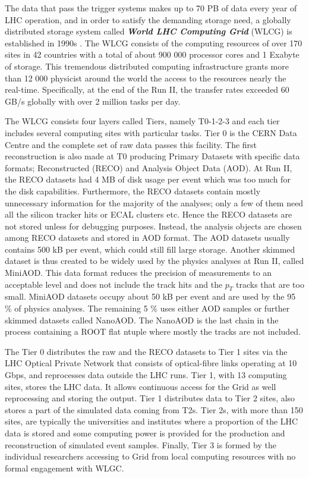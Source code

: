 The data that pass the trigger systems makes up to 70 PB of data every year of LHC operation, and in order to satisfy the demanding storage need, a globally distributed storage system called \emph{\textbf{World LHC Computing Grid}} (WLCG) is established in 1990s \cite{Bayatyan:838359}. The WLCG consists of the computing resources of over 170 sites in 42 countries with a total of about 900 000 processor cores and 1 Exabyte of storage. This tremendous distributed computing infrastructure grants more than 12 000 physicist around the world the access to the resources nearly the real-time. Specifically, at the end of the Run II, the transfer rates exceeded 60 GB/s globally with over 2 million tasks per day.

The WLCG consists four layers called Tiers, namely T0-1-2-3 and each tier includes several computing sites with particular tasks. Tier 0 is the CERN Data Centre and the complete set of raw data passes this facility. The first reconstruction is also made at T0 producing Primary Datasets with specific data formats; Reconstructed (RECO) and Analysis Object Data (AOD). At Run II, the RECO datasets had 4 MB of disk usage per event which was too much for the disk capabilities. Furthermore, the RECO datasets contain mostly unnecessary information for the majority of the analyses; only a few of them need all the silicon tracker hits or ECAL clusters etc. Hence the RECO datasets are not stored unless for debugging purposes. Instead, the analysis objects are chosen among RECO datasets and stored in AOD format. The AOD datasets usually contains 500 kB per event, which could still fill large storage. Another skimmed dataset is thus created to be widely used by the physics analyses at Run II, called MiniAOD. This data format reduces the precision of measurements to an acceptable level and does not include the track hits and the $p_T$ tracks that are too small. MiniAOD datasets occupy about 50 kB per event and are used by the 95 \% of physics analyses. The remaining 5 \% uses either AOD samples or further skimmed datasets called NanoAOD. The NanoAOD is the last chain in the process containing a ROOT flat ntuple where mostly the tracks are not included.

The Tier 0 distributes the raw and the RECO datasets to Tier 1 sites via the LHC Optical Private Network that consists of optical-fibre links operating at 10 Gbps, and reprocesses data outside the LHC runs. Tier 1, with 13 computing sites, stores the LHC data. It allows continuous access for the Grid as well reprocessing and storing the output. Tier 1 distributes data to Tier 2 sites, also stores a part of the simulated data coming from T2s. Tier 2s, with more than 150 sites, are typically the universities and institutes where a proportion of the LHC data is stored and some computing power is provided for the production and reconstruction of simulated event samples. Finally, Tier 3 is formed by the individual researchers accessing to Grid from local computing resources with no formal engagement with WLGC.


